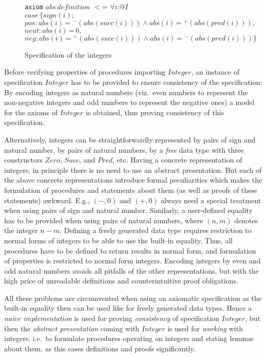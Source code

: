 \documentclass{article}
\theoremstyle{remark}
\theoremstyle{definition}
\newcommand{\ieq}{\,\texttt{=}\,}
\newcommand{\name}[1]{\mathit{#1}}
\begin{document}
\begin{figure}[t]
\begin{tabbing}
\> \texttt{axiom} $\name{abs}\ \name{definition}$ $<$= $\forall i$:$@I$ \\
\> \> $\name{case}\,\{\name{sign}(i);$ \\
\> \> \> $\name{pos}: \name{abs}(i)\ieq\,^-(\name{abs}(\name{succ}(i))) \wedge \name{abs}(i)\ieq\,^+(\name{abs}(\name{pred}(i))),$ \\
\> \> \> $\name{neut}: \name{abs}(i)\ieq0,$ \\
\> \> \> $\name{neg}: \name{abs}(i)\ieq\,^+(\name{abs}(\name{succ}(i))) \wedge
\name{abs}(i)\ieq\,^-(\name{abs}(\name{pred}(i)))\}$
\end{tabbing}

\caption{Specification of the integers} \label{fig:integers}
\end{figure}


Before verifying properties of procedures importing $\name{Integer}$, an instance of specification $\name{Integer}$ has
to be provided to ensure consistency of the specification: By encoding integers as natural numbers (viz.\ even numbers
to represent the non-negative integers and odd numbers to represent the negative ones) a model for the axioms of
$\name{Integer}$ is obtained, thus proving consistency of this specification.

Alternatively, integers can be straightforwardly represented by pairs of sign and natural number, by pairs of natural
numbers, by a \emph{free} data type with three constructors $\name{Zero}$, $\name{Succ}$, and $\name{Pred}$, etc.
Having a concrete representation of integers, in principle there is no need to use an abstract presentation. But each
of the above concrete representations introduce formal peculiarities which makes the formulation of procedures and
statements about them (as well as proofs of these statements) awkward. E.g., $(-,0)$ and $(+,0)$ always need a special
treatment when using pairs of sign and natural number. Similarly, a user-defined equality has to be provided when using
pairs of natural numbers, where $(n,m)$ denotes the integer $n-m$. Defining a freely generated data type requires
restriction to normal forms of integers to be able to use the built-in equality. Thus, all procedures have to be
defined to return results in normal form, and formulation of properties is restricted to normal form integers. Encoding
integers by even and odd natural numbers avoids all pitfalls of the other representations, but with the high price of
unreadable definitions and counterintuitive proof obligations.

All these problems are circumvented when using an axiomatic specification as the built-in equality then can be used
like for freely generated data types. Hence a \emph{naive implementation} is used for proving \emph{consistency} of
specification $\name{Integer}$, but then the \emph{abstract presentation} coming with $\name{Integer}$ is used for
\emph{working} with integers, i.e.\ to formulate procedures operating on integers and stating lemmas about them, as
this eases definitions and proofs significantly.
\end{document}
